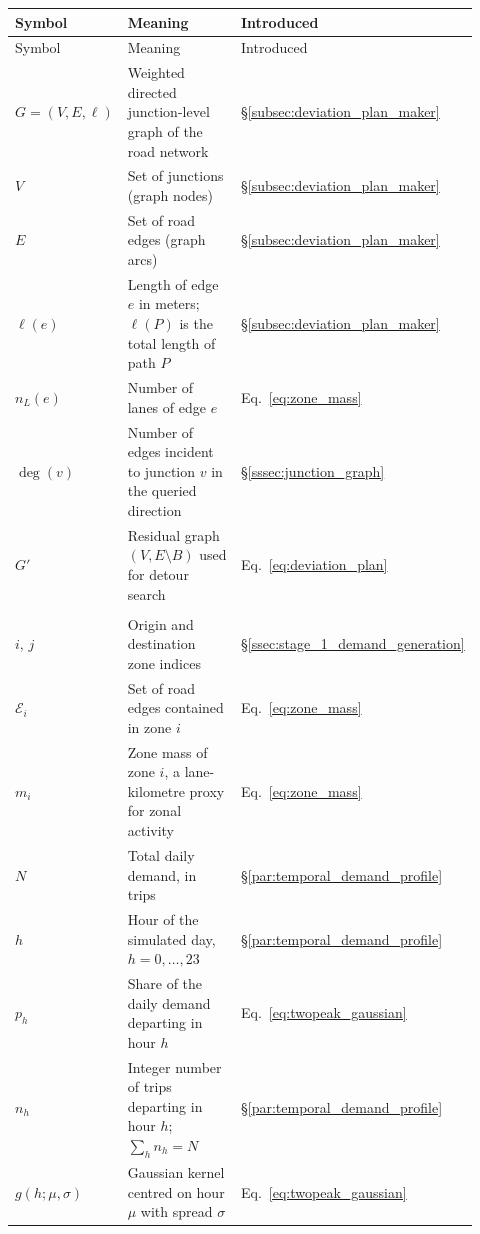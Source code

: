 \begin{longtable}{@{}p{0.16\linewidth}>{\raggedright\arraybackslash}p{0.60\linewidth}p{0.16\linewidth}@{}}
\toprule
Symbol & Meaning & Introduced \\
\midrule
\endfirsthead
\toprule
Symbol & Meaning & Introduced \\
\midrule
\endhead
\bottomrule
\endfoot
\bottomrule
\endlastfoot

$G=(V,E,\ell)$ & Weighted directed junction-level graph of the road network \newline & \S\ref{subsec:deviation_plan_maker} \\
$V$ & Set of junctions (graph nodes) & \S\ref{subsec:deviation_plan_maker} \\
$E$ & Set of road edges (graph arcs) & \S\ref{subsec:deviation_plan_maker} \\
$\ell(e)$ & Length of edge $e$ in meters; $\ell(P)$ is the total length of path $P$ & \S\ref{subsec:deviation_plan_maker} \\
$n_L(e)$ & Number of lanes of edge $e$ & Eq.~\eqref{eq:zone_mass} \\
$\deg(v)$ & Number of edges incident to junction $v$ in the queried direction & \S\ref{sssec:junction_graph} \\
$G'$ & Residual graph $(V, E\setminus B)$ used for detour search & Eq.~\eqref{eq:deviation_plan} \\
\addlinespace
\multicolumn{3}{@{}l}{\textbf{Demand generation}}\\
\addlinespace
$i,\,j$ & Origin and destination zone indices & \S\ref{ssec:stage_1_demand_generation} \\
$\mathcal{E}_i$ & Set of road edges contained in zone $i$ & Eq.~\eqref{eq:zone_mass} \\
$m_i$ & Zone mass of zone $i$, a lane-kilometre proxy for zonal activity & Eq.~\eqref{eq:zone_mass} \\
$N$ & Total daily demand, in trips & \S\ref{par:temporal_demand_profile} \\
$h$ & Hour of the simulated day, $h=0,\ldots,23$ & \S\ref{par:temporal_demand_profile} \\
$p_h$ & Share of the daily demand departing in hour $h$ & Eq.~\eqref{eq:twopeak_gaussian} \\
$n_h$ & Integer number of trips departing in hour $h$; $\sum_h n_h = N$ & \S\ref{par:temporal_demand_profile} \\
$g(h;\mu,\sigma)$ & Gaussian kernel centred on hour $\mu$ with spread $\sigma$ & Eq.~\eqref{eq:twopeak_gaussian} \\

\end{longtable}

